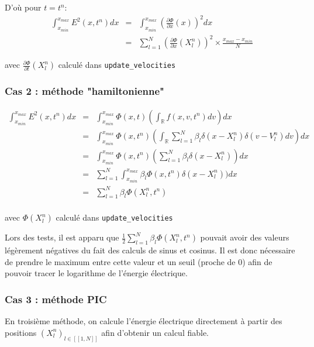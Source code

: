 \documentclass[a4paper,11pt]{article}
\newcommand{\Python}[1]{\texttt{#1}}
\begin{document}
D'où pour $t = t^n$:
$$
\begin{array}{rcl}
\int_{x_{min}}^{x_{max}} E^2(x,t^n)dx &=& \int_{x_{min}}^{x_{max}} (\frac{\partial \Phi}{\partial x}(x))^2dx \\
 &=& \sum\limits_{l=1}^{N} (\frac{\partial \Phi}{\partial x}(X_l^n))^2 \times \frac{x_{max}-x_{min}}{N}
\end{array}
$$

avec $\frac{\partial \Phi}{\partial t}(X_l^n)$ calculé dans \Python{update_velocities}

\subsubsection{Cas 2 : méthode "hamiltonienne"}
\label{energy hamil}

$$
\begin{array}{rcl}
\int_{x_{min}}^{x_{max}} E^2(x,t^n)dx &=& \int_{x_{min}}^{x_{max}} \Phi(x,t)(\int_{\mathbb{R}} f(x,v,t^n) dv) dx\\
 &=& \int_{x_{min}}^{x_{max}} \Phi(x,t^n)(\int_{\mathbb{R}} \sum\limits_{l=1}^N \beta_l \delta(x-X_l^n) \delta(v -  V_l^n) dv) dx\\
 &=& \int_{x_{min}}^{x_{max}} \Phi(x,t^n)(\sum\limits_{l=1}^N \beta_l \delta(x -X_l^n)) dx\\
 &=& \sum\limits_{l=1}^N \int_{x_{min}}^{x_{max}} \beta_l \Phi(x,t^n)	\delta(x -X_l^n)) dx\\
 &=& \sum\limits_{l=1}^N  \beta_l \Phi(X_l^n, t^n) \\
\end{array}
$$

avec $\Phi(X_l^n)$ calculé dans \Python{update_velocities}

Lors des tests, il est apparu que $ \frac{1}{2} \sum\limits_{l=1}^N  \beta_l \Phi(X_l^n, t^n)$ pouvait avoir des valeurs légèrement négatives du fait des calculs de sinus et cosinus. Il est donc nécessaire de prendre le maximum entre cette valeur et un seuil (proche de 0) afin de pouvoir tracer le logarithme de l'énergie électrique.

\subsubsection{Cas 3 : méthode PIC}
\label{energie PIC}

En troisième méthode, on calcule l'énergie électrique directement à partir des positions $(X_l^n)_{l \in [\![1, N]\!]}$ afin d'obtenir un calcul fiable.
\end{document}
